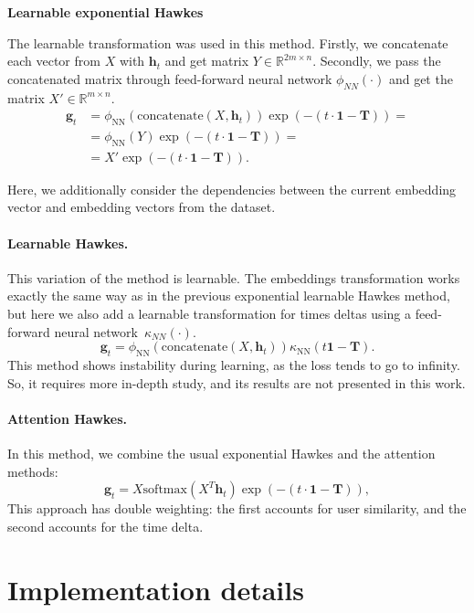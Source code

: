\textbf{Learnable exponential Hawkes}

The learnable transformation was used in this method. Firstly, we concatenate each vector from  $X$ with $\mathbf{h}_t$ and get matrix $Y \in \mathbb{R}^{2m \times n}$. Secondly, we pass the concatenated matrix through feed-forward neural network $\phi_{NN}(\cdot)$ and get the matrix  $X'\in \mathbb{R}^{m \times n}$. 
\begin{align*}
        \mathbf{g}_t &= \phi_{\mathrm{NN}}(\mathrm{concatenate}(X, \mathbf{h}_t))\exp{(-(t \cdot \mathbf{1} - \mathbf{T}))} =\\ 
     &= \phi_{\mathrm{NN}}(Y)\exp{(-(t \cdot \mathbf{1} - \mathbf{T}))} = \\
     &= X'\exp{(-(t \cdot \mathbf{1} - \mathbf{T}))}.
\end{align*}

Here, we additionally consider the dependencies between the current embedding vector and embedding vectors from the dataset.

\paragraph{Learnable Hawkes.}
This variation of the method is learnable. The embeddings transformation works exactly the same way as in the previous exponential learnable Hawkes method, but here we also add a learnable transformation for times deltas using a feed-forward neural network~$\kappa_{NN}(\cdot)$.
\[
    \mathbf{g}_t = \phi_{\mathrm{NN}}(\text{concatenate}(X, \mathbf{h}_t))\kappa_{\mathrm{NN}}(t \mathbf{1} - \mathbf{T}). 
\]
This method shows instability during learning, as the loss tends to go to infinity. So, it requires more in-depth study, and its results are not presented in this work.

\paragraph{Attention Hawkes.} In this method, we combine the usual exponential Hawkes and the attention methods:
\begin{equation}
     \mathbf{g}_t = X\mathrm{softmax}(X^T \mathbf{h}_t)\exp{(-(t \cdot \mathbf{1} - \mathbf{T}))},
\end{equation}
This approach has double weighting: the first accounts for user similarity, and the second accounts for the time delta.

\section{Implementation details}~\label{sec:details}

